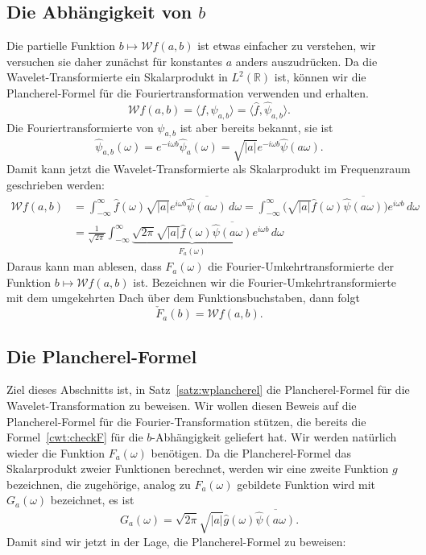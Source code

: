 \subsection{Die Abhängigkeit von $b$}
Die partielle Funktion $b\mapsto \mathcal{W}f(a,b)$ ist etwas einfacher
zu verstehen, wir versuchen sie daher zunächst für konstantes $a$
anders auszudrücken.
Da die Wavelet-Transformierte ein Skalarprodukt in $L^2(\mathbb R)$
ist, können wir die Plancherel-Formel für die Fouriertransformation
verwenden und erhalten.
\[
\mathcal{W}f (a,b)
=
\langle f,\psi_{a,b} \rangle
=
\langle \hat{f}, \hat{\psi}_{a,b}\rangle.
\]
Die Fouriertransformierte von $\psi_{a,b}$ ist aber bereits bekannt,
sie ist
\[
\hat{\psi}_{a,b}(\omega)
=
e^{-i\omega b} \hat{\psi}_a(\omega)
=
\sqrt{|a|}e^{-i\omega b} \hat{\psi}(a\omega).
\]
Damit kann jetzt die Wavelet-Transformierte als Skalarprodukt im
Frequenzraum geschrieben werden:
\begin{align*}
\mathcal{W}f (a,b)
&=
\int_{-\infty}^\infty 
\hat{f}(\omega)
\sqrt{|a|}e^{i\omega b} \overline{\hat{\psi}(a\omega)}
\,d\omega
=
\int_{-\infty}^\infty
\bigl(
\sqrt{|a|}
\hat{f}(\omega)
\overline{\hat{\psi}(a\omega)}
\bigr)
e^{i\omega b}
\,d\omega
\\
&=
\frac1{\sqrt{2\pi}}
\int_{-\infty}^\infty
\underbrace{
\sqrt{2\pi}
\sqrt{|a|}
\hat{f}(\omega)
\overline{\hat{\psi}(a\omega)}}_{\displaystyle F_a(\omega)}
e^{i\omega b}
\,d\omega
\end{align*}
Daraus kann man ablesen, dass $F_a(\omega)$ die Fourier-Umkehrtransformierte
der Funktion $b\mapsto \mathcal{W}f(a,b)$ ist.
Bezeichnen wir die Fourier-Umkehrtransformierte mit dem umgekehrten
Dach über dem Funktionsbuchstaben,
dann folgt
\begin{equation}
\check{F}_a(b) = \mathcal{W}f(a, b).
\label{cwt:checkF}
\end{equation}

\subsection{Die Plancherel-Formel}
Ziel dieses Abschnitts ist, in Satz~\ref{satz:wplancherel} die
Plancherel-Formel für die Wavelet-Transformation zu beweisen.
Wir wollen diesen Beweis auf die Plancherel-Formel für die 
Fourier-Transformation stützen, die bereits die Formel~\eqref{cwt:checkF}
für die $b$-Abhängigkeit geliefert hat.
Wir werden natürlich wieder die Funktion $F_a(\omega)$ benötigen.
Da die Plancherel-Formel das Skalarprodukt zweier Funktionen berechnet,
werden wir eine zweite Funktion $g$ bezeichnen, die zugehörige, analog
zu $F_a(\omega)$ gebildete Funktion wird mit $G_a(\omega)$ bezeichnet,
es ist
\[
G_a(\omega)
=
\sqrt{2\pi}\sqrt{|a|}
\hat{g}(\omega)
\overline{\hat{\psi}(a\omega)}.
\]
Damit sind wir jetzt in der Lage, die Plancherel-Formel zu beweisen:

